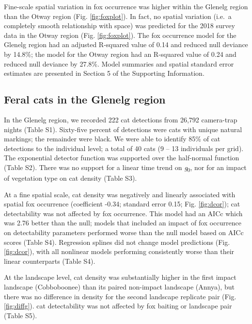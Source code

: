 \documentclass[]{elsarticle} %
\begin{document}
Fine-scale spatial variation in fox occurrence was higher within the Glenelg region than the Otway region (Fig. \ref{fig:foxplot}). In fact, no spatial variation (i.e.~a completely smooth relationship with space) was predicted for the 2018 survey data in the Otway region (Fig. \ref{fig:foxplot}). The fox occurrence model for the Glenelg region had an adjusted R-squared value of 0.14 and reduced null deviance by 14.8\%; the model for the Otway region had an R-squared value of 0.24 and reduced null deviance by 27.8\%. Model summaries and spatial standard error estimates are presented in Section 5 of the Supporting Information.

\hypertarget{feral-cats-in-the-glenelg-region}{%
\subsection{Feral cats in the Glenelg region}\label{feral-cats-in-the-glenelg-region}}

In the Glenelg region, we recorded 222 cat detections from 26,792 camera-trap nights (Table S1). Sixty-five percent of detections were cats with unique natural markings; the remainder were black. We were able to identify 85\% of cat detections to the individual level; a total of 40 cats (9 -- 13 individuals per grid). The exponential detector function was supported over the half-normal function (Table S2). There was no support for a linear time trend on \emph{g}\textsubscript{0}, nor for an impact of vegetation type on cat density (Table S3).

At a fine spatial scale, cat density was negatively and linearly associated with spatial fox occurrence (coefficient -0.34; standard error 0.15; Fig. \ref{fig:dcor}); cat detectability was not affected by fox occurrence. This model had an AICc which was 2.76 better than the null; models that included an impact of fox occurrence on detectability parameters performed worse than the null model based on AICc scores (Table S4). Regression splines did not change model predictions (Fig. \ref{fig:dcor}), with all nonlinear models performing consistently worse than their linear counterparts (Table S4).

At the landscape level, cat density was substantially higher in the first impact landscape (Cobboboonee) than its paired non-impact landscape (Annya), but there was no difference in density for the second landscape replicate pair (Fig. \ref{fig:diffg}). cat detectability was not affected by fox baiting or landscape pair (Table S5).
\end{document}
